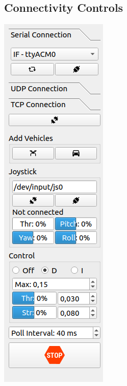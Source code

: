 \documentclass[12pt]{article} %
\begin{document}



\subsection{Connectivity Controls}


\noindent \begin{minipage}{0.2\textwidth}
  \noindent \includegraphics[width=\textwidth]{./screens/Left_controls1.png}

\end{minipage}
\end{document}

